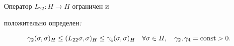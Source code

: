 \begin{lem} 


\label{fulldef2}


Оператор $L_{22}:H \to H $ ограничен и


положительно определен{\em :}


\end{lem} 


$$


\gamma _{2}(\sigma ,\sigma )_{H}\le 


(L_{22}\sigma ,\sigma )_{H}\le \gamma _{4}


(\sigma ,\sigma )_{H}\quad \forall \sigma \in H, \quad


\gamma _2, \gamma _4 = \const > 0.


$$






